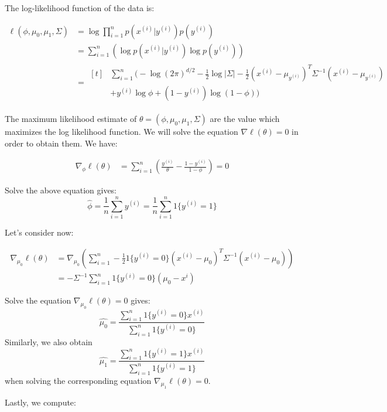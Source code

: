 \begin{answer}
The log-likelihood function of the data is:

\begin{align}
	\ell(\phi, \mu_0, \mu_1, \Sigma)
	&= \log \prod \limits_{i = 1}^{n} p(x^{(i)}|y^{(i)})p(y^{(i)}) \\
	&= \sum \limits_{i = 1}^{n} (\log p(x^{(i)}|y^{(i)}) \log p(y^{(i)})) \\
	&= 
	\begin{aligned}[t]
		& \sum \limits_{i = 1}^{n} \bigg( -\log (2\pi)^{d/2} - \frac{1}{2}\log |\Sigma| - \frac{1}{2}(x^{(i)} - \mu_{y^{(i)}})^T \Sigma^{-1} (x^{(i)} - \mu_{y^{(i)}}) \\
		& + y^{(i)}\log\phi + (1 - y^{(i)})\log(1 - \phi) \bigg)
	\end{aligned}
\end{align}

The maximum likelihood estimate of  $\theta = (\phi, \mu_0, \mu_1, \Sigma)$ are the value which maximizes the log likelihood function. We will solve the equation $\nabla \ell(\theta) = 0$ in order to obtain them. We have:

\begin{align}
	\nabla_{\phi} \ell(\theta) 
	&= \sum \limits_{i = 1}^{n} \left( \frac{y^{(i)}}{\theta} - \frac{1 - y^{(i)}}{1 - \phi} \right)
	= 0
\end{align}

Solve the above equation gives:
$$\hat{\phi} = \frac{1}{n} \sum \limits_{i = 1}^{n} y^{(i)} = \frac{1}{n} \sum \limits_{i = 1}^{n} 1\{y^{(i)} = 1\}$$

Let's consider now:

\begin{align}
	\nabla_{\mu_0} \ell(\theta) &
	= \nabla_{\mu_0} \left( \sum \limits_{i = 1}^{n} - \frac{1}{2} 1\{y^{(i)} = 0\} (x^{(i)} - \mu_0)^T \Sigma^{-1} (x^{(i)} - \mu_0) \right) \\
	&= - \Sigma^{-1} \sum \limits_{i = 1}^{n} 1\{y^{(i)} = 0\}(\mu_0 - x^{i})
\end{align}

Solve the equation $\nabla_{\mu_0} \ell(\theta) = 0$ gives: $$\widehat{\mu_0} = \frac{ \sum_{i = 1}^{n} 1\{y^{(i)} = 0\}x^{(i)}}{\sum_{i = 1}^{n} 1\{y^{(i)} = 0\}}$$
Similarly, we also obtain $$\widehat{\mu_1} = \frac{ \sum_{i = 1}^{n} 1\{y^{(i)} = 1\}x^{(i)}}{\sum_{i = 1}^{n} 1\{y^{(i)} = 1\}}$$ when solving the corresponding equation $\nabla_{\mu_1} \ell(\theta) = 0$.

Lastly, we compute:


\end{answer}
